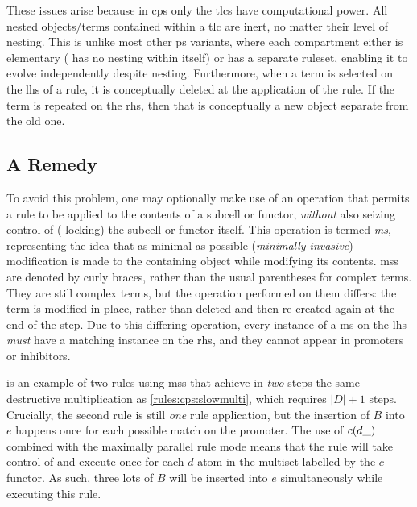 These issues arise because in \gls{cps} only the \glspl{tlc} have computational power.  All nested objects/terms contained within a \gls{tlc} are inert, no matter their level of nesting.  This is unlike most other \gls{ps} variants, where each \gls{compartment} either is elementary (\ie{} has no nesting within itself) or has a separate ruleset, enabling it to evolve independently despite nesting.  Furthermore, when a term is selected on the \gls{lhs} of a rule, it is conceptually deleted at the application of the rule.  If the term is repeated on the \gls{rhs}, then that is conceptually a new object separate from the old one.

\subsection{A Remedy}
To avoid this problem, one may optionally make use of an operation that permits a rule to be applied to the contents of a subcell or \gls{functor}, \emph{without} also seizing control of (\ie{} locking) the subcell or \gls{functor} itself.  This operation is termed \emph{\gls{ms}}, representing the idea that as-minimal-as-possible (\emph{minimally-invasive}) modification is made to the containing object while modifying its contents.  \Glspl{ms} are denoted by curly braces, rather than the usual parentheses for complex terms.  They are still complex terms, but the operation performed on them differs:  the term is modified in-place, rather than deleted and then re-created again at the end of the step.  Due to this differing operation, every instance of a \gls{ms} on the \gls{lhs} \emph{must} have a matching instance on the \gls{rhs}, and they cannot appear in \glspl{promoter} or \glspl{inhibitor}.

\begin{cprulesetfloat}
    \begin{cpruleset}

    \end{cpruleset}
    \caption[Rules for destructive multiplication]{\label{rules:cps:microsurg}Rules for a destructive multiplication process that requires exactly two steps regardless of the numbers multiplied by using \gls{cps} \glspl{ms}}
\end{cprulesetfloat}

 is an example of two rules using \glspl{ms} that achieve in \emph{two} steps the same destructive multiplication as \cref{rules:cps:slowmulti}, which requires \(|D| + 1\) steps.  Crucially, the second rule is still \emph{one} rule application, but the insertion of \(B\) into \(e\) happens once for each possible match on the \gls{promoter}.  The use of \(c(d\_)\) combined with the maximally parallel rule mode means that the rule will take control of and execute once for each \(d\) atom in the multiset labelled by the \(c\) \gls{functor}.  As such, three lots of \(B\) will be inserted into \(e\) simultaneously while executing this rule.

